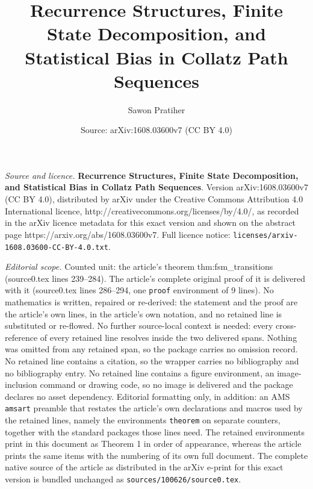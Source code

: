 \documentclass[10pt,a4paper]{amsart}
\title{\textbf{Recurrence Structures, Finite State Decomposition, and Statistical Bias in Collatz Path Sequences}}
\author{Sawon Pratiher}
\date{Source: arXiv:1608.03600v7 (CC BY 4.0)}
\begin{document}
\maketitle

\noindent\emph{Source and licence.} \textbf{Recurrence Structures, Finite State Decomposition, and Statistical Bias in Collatz Path Sequences}. Version arXiv:1608.03600v7 (CC BY 4.0), distributed by arXiv under the Creative Commons Attribution 4.0 International licence, http://creativecommons.org/licenses/by/4.0/, as recorded in the arXiv licence metadata for this exact version and shown on the abstract page https://arxiv.org/abs/1608.03600v7. Full licence notice: \texttt{licenses/arxiv-1608.03600-CC-BY-4.0.txt}.\par\smallskip

\noindent\textit{Editorial scope.} Counted unit: the article's theorem thm:fsm\_transitions (source0.tex lines 239--284). The article's complete original proof of it is delivered with it (source0.tex lines 286--294, one \texttt{proof} environment of 9 lines). No mathematics is written, repaired or re-derived: the statement and the proof are the article's own lines, in the article's own notation, and no retained line is substituted or re-flowed.  No further source-local context is needed: every cross-reference of every retained line resolves inside the two delivered spans.  Nothing was omitted from any retained span, so the package carries no omission record.  No retained line contains a citation, so the wrapper carries no bibliography and no bibliography entry.  No retained line contains a figure environment, an image-inclusion command or drawing code, so no image is delivered and the package declares no asset dependency.  Editorial formatting only, in addition: an AMS \texttt{amsart} preamble that restates the article's own declarations and macros used by the retained lines, namely the environments \texttt{theorem} on separate counters, together with the standard packages those lines need.  The retained environments print in this document as Theorem 1 in order of appearance, whereas the article prints the same items with the numbering of its own full document.  The complete native source of the article as distributed in the arXiv e-print for this exact version is bundled unchanged as \texttt{sources/100626/source0.tex}.
\end{document}

